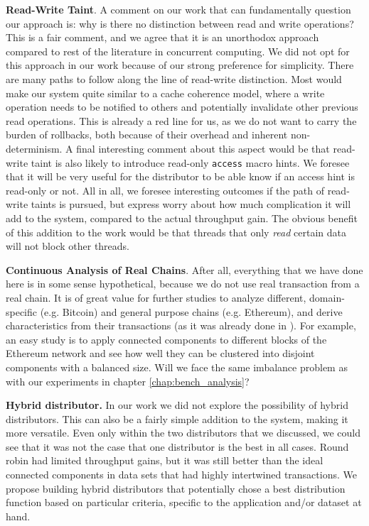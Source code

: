 \textbf{Read-Write Taint}. A comment on our work that can fundamentally question our approach is:
why is there no distinction between read and write operations? This is a fair comment, and we agree
that it is an unorthodox approach compared to rest of the literature in concurrent computing. We did
not opt for this approach in our work because of our strong preference for simplicity. There are
many paths to follow along the line of read-write distinction. Most would make our system quite
similar to a cache coherence model, where a write operation needs to be notified to others and
potentially invalidate other previous read operations. This is already a red line for us, as we do
not want to carry the burden of rollbacks, both because of their overhead and inherent
non-determinism. A final interesting comment about this aspect would be that read-write taint is
also likely to introduce read-only \texttt{access} macro hints. We foresee that it will be very
useful for the distributor to be able know if an access hint is read-only or not. All in all, we
foresee interesting outcomes if the path of read-write taints is pursued, but express worry about
how much complication it will add to the system, compared to the actual throughput gain. The obvious
benefit of this addition to the work would be that threads that only \textit{read} certain data will
not block other threads.

\textbf{Continuous Analysis of Real Chains}. After all, everything that we have done here is in some
sense hypothetical, because we do not use real transaction from a real chain. It is of great value
for further studies to analyze different, domain-specific (e.g. Bitcoin) and general purpose chains
(e.g. Ethereum), and derive characteristics from their transactions (as it was already done in
\cite{saraphEmpiricalStudySpeculative2019}). For example, an easy study is to apply connected
components to different blocks of the Ethereum network and see how well they can be clustered into
disjoint components with a balanced size. Will we face the same imbalance problem as with our
experiments in chapter \ref{chap:bench_analysis}?

\textbf{Hybrid distributor.} In our work we did not explore the possibility of hybrid distributors.
This can also be a fairly simple addition to the system, making it more versatile. Even only within
the two distributors that we discussed, we could see that it was not the case that one distributor
is the best in all cases. Round robin had limited throughput gains, but it was still better than the
ideal connected components in data sets that had highly intertwined transactions. We propose
building hybrid distributors that potentially chose a best distribution function based on particular
criteria, specific to the application and/or dataset at hand.

